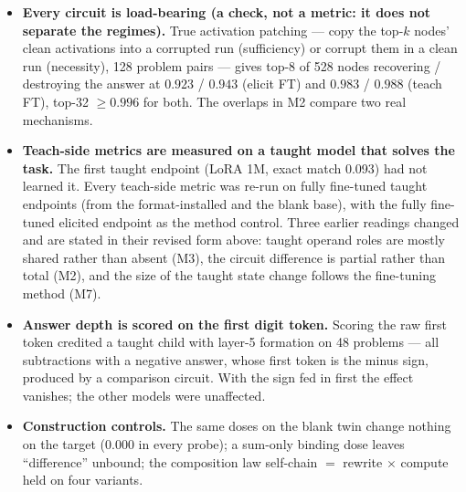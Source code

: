 \documentclass[11pt]{article}
\begin{document}
\begin{itemize}[nosep]
  \item \textbf{Every circuit is load-bearing (a check, not a metric: it does not separate the
    regimes).} True activation patching --- copy the top-$k$ nodes' clean activations into a
    corrupted run (sufficiency) or corrupt them in a clean run (necessity), 128 problem pairs ---
    gives top-8 of 528 nodes recovering / destroying the answer at $0.923$ / $0.943$ (elicit FT)
    and $0.983$ / $0.988$ (teach FT), top-32 $\ge0.996$ for both. The overlaps in M2 compare two
    real mechanisms.
  \item \textbf{Teach-side metrics are measured on a taught model that solves the task.} The
    first taught endpoint (LoRA 1M, exact match 0.093) had not learned it. Every teach-side
    metric was re-run on fully fine-tuned taught endpoints (from the format-installed and the
    blank base), with the fully fine-tuned elicited endpoint as the method control. Three earlier
    readings changed and are stated in their revised form above: taught operand roles are mostly
    shared rather than absent (M3), the circuit difference is partial rather than total (M2), and
    the size of the taught state change follows the fine-tuning method (M7).
  \item \textbf{Answer depth is scored on the first digit token.} Scoring the raw first token
    credited a taught child with layer-5 formation on 48 problems --- all subtractions with a
    negative answer, whose first token is the minus sign, produced by a comparison circuit. With
    the sign fed in first the effect vanishes; the other models were unaffected.
  \item \textbf{Construction controls.} The same doses on the blank twin change nothing on the
    target (0.000 in every probe); a sum-only binding dose leaves ``difference'' unbound; the
    composition law self-chain $=$ rewrite $\times$ compute held on four variants.
\end{itemize}
\end{document}
